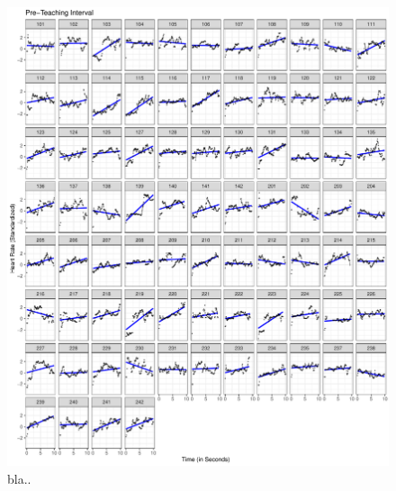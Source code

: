 \documentclass[preprint, 3p,
authoryear]{elsarticle} %
\begin{document}
\begin{figure}[htbp]
  \centering
  \includegraphics[width=1\textwidth]{plots_publication/plot_preparation_appendix.pdf}
  \caption{bla..}
  \label{preparation}
\end{figure}
\end{document}
